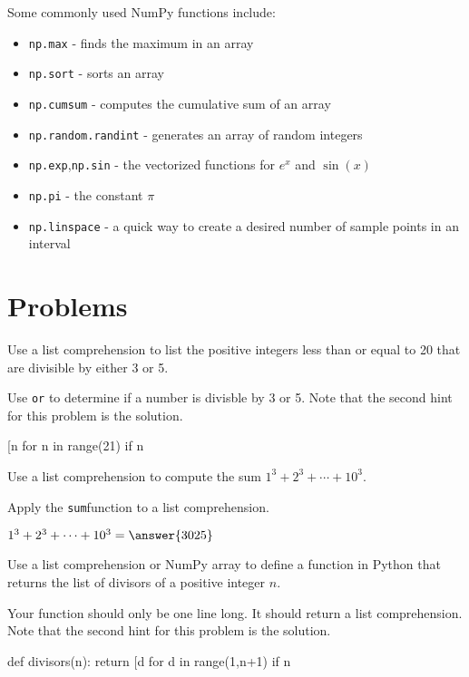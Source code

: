 \documentclass{ximera}
\begin{document}
Some commonly used NumPy functions include:

\begin{itemize}
	\item \verb|np.max| - finds the maximum in an array
	\item \verb|np.sort| - sorts an array
	\item \verb|np.cumsum| - computes the cumulative sum of an array
	\item \verb|np.random.randint| - generates an array of random integers
	\item \verb|np.exp|,\verb|np.sin| - the vectorized functions for $e^x$ and $\sin(x)$
	\item \verb|np.pi| - the constant $\pi$
	\item \verb|np.linspace| - a quick way to create a desired number of sample points in an interval
\end{itemize}

\section{Problems}

\begin{question}
Use a list comprehension to list the positive integers less than or equal to 20 that are divisible by either 3 or 5.
	\begin{hint}
	Use \verb|or| to determine if a number is divisble by 3 or 5. Note that the second hint for this problem is the solution.
	\end{hint}
	\begin{hint}
\begin{sageCell}
	[n for n in range(21) if n%
\end{sageCell}
	\end{hint}
\end{question}

\begin{question}
Use a list comprehension to compute the sum $1^3+2^3+\cdots+10^3.$
	\begin{hint}
	Apply the \verb|sum|function to a list comprehension.
	\end{hint}
        $1^3+2^3+\cdots+10^3=\answer{3025}$
\end{question}

\begin{question}
Use a list comprehension or NumPy array to define a function in Python that returns the list of divisors of a positive integer $n$.
	\begin{hint}
	Your function should only be one line long. It should return a list comprehension. Note that the second hint for this problem is the solution.
	\end{hint}
	\begin{hint}
\begin{sageCell}
def divisors(n):
        return [d for d in range(1,n+1) if n%
\end{sageCell}
	\end{hint}
\end{question}
\end{document}
